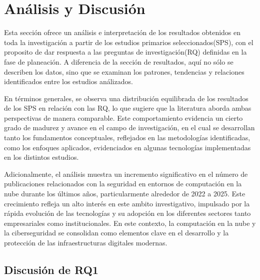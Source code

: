 \section{Análisis y Discusión}\label{sec:analisis-discusion}

Esta sección ofrece un análisis e interpretación de los resultados obtenidos en toda la investigación a partir de los estudios primarios 
seleccionados(SPS), con el proposito de dar respuesta a las preguntas de investigación(RQ) definidas en la fase de planeación. 
A diferencia de la sección de resultados, aquí no sólo se describen los datos, sino que se examinan los patrones, tendencias y relaciones 
identificados entre los estudios análizados.

En términos generales, se observa una distribución equilibrada de los resultados de los SPS en relación con las RQ, lo que sugiere que 
la literatura aborda ambas perspectivas de manera comparable. Este comportamiento evidencia un cierto grado de madurez y avance en el 
campo de investigación, en el cual se desarrollan tanto los fundamentos conceptuales, reflejados en las metodologías identificadas, 
como los enfoques aplicados, evidenciados en algunas tecnologías implementadas en los distintos estudios.

Adicionalmente, el análisis muestra un incremento significativo en el número de publicaciones relacionados con la seguridad en entornos 
de computación en la nube durante los últimos años, particularmente alrededor de 2022 a 2025. Este crecimiento refleja un alto interés en 
este ambito investigativo, impulsado por la rápida evolución de las tecnologías y su adopción en los diferentes sectores tanto 
empresariales como institucionales. En este contexto, la computación en la nube y la ciberseguridad se consolidan como elementos 
clave en el desarrollo y la protección de las infraestructuras digitales modernas.

\subsection{Discusión de RQ1}


